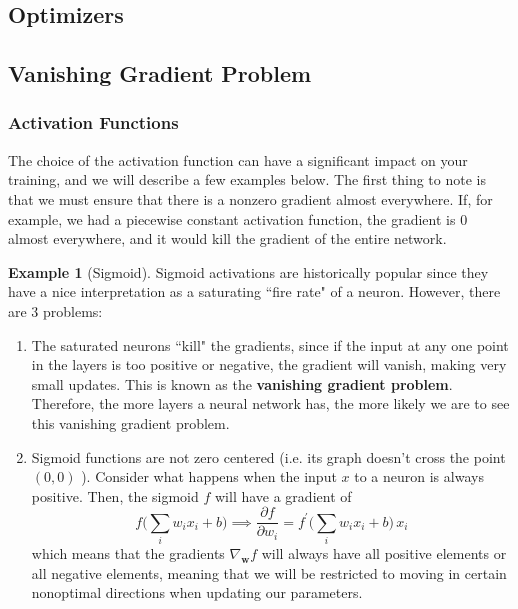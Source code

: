 \documentclass{article}
\theoremstyle{definition}
\newtheorem{example}{Example}[section]
\theoremstyle{remark}
\theoremstyle{definition}
\begin{document}
\subsection{Optimizers}



\subsection{Vanishing Gradient Problem}

\subsubsection{Activation Functions}

The choice of the activation function can have a significant impact on your training, and we will describe a few examples below. The first thing to note is that we must ensure that there is a nonzero gradient almost everywhere. If, for example, we had a piecewise constant activation function, the gradient is $0$ almost everywhere, and it would kill the gradient of the entire network. 

\begin{example}[Sigmoid]
Sigmoid activations are historically popular since they have a nice interpretation as a saturating ``fire rate" of a neuron. However, there are 3 problems: 
\begin{enumerate}
    \item The saturated neurons ``kill" the gradients, since if the input at any one point in the layers is too positive or negative, the gradient will vanish, making very small updates. This is known as the \textbf{vanishing gradient problem}. Therefore, the more layers a neural network has, the more likely we are to see this vanishing gradient problem. 
    \item Sigmoid functions are not zero centered (i.e. its graph doesn't cross the point $(0, 0)$ ). Consider what happens when the input $x$ to a neuron is always positive. Then, the sigmoid $f$ will have a gradient of 
    \[f \bigg( \sum_i w_i x_i + b \bigg) \implies \frac{\partial f}{\partial w_i} = f^\prime \bigg( \sum_i w_i x_i + b \bigg) 
    \, x_i\]
    which means that the gradients $\nabla_\mathbf{w} f$ will always have all positive elements or all negative elements, meaning that we will be restricted to moving in certain nonoptimal directions when updating our parameters. 
\end{enumerate}
\end{example}
\end{document}
